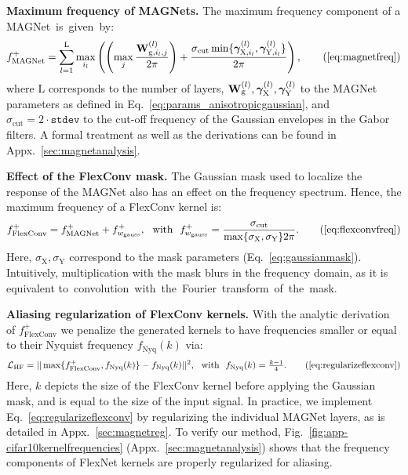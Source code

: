 \documentclass{article} \usepackage{iclr2022_conference,times}
\newcommand{\mat}[1]{\ensuremath{{\mathbf{\MakeUppercase{{#1}}}}}}
\newcommand{\Wm}{\mat{W}}
\def\Xt{\mathrm{X}}
\def\Yt{\mathrm{Y}}
\begin{document}
\textbf{Maximum frequency of MAGNets.}
The maximum frequency component of a MAGNet~is~given~by:
\begin{equation}
\setlength{\abovedisplayskip}{3pt}
\setlength{\belowdisplayskip}{2pt}
    f^+_{\textrm{MAGNet}} = \sum_{l=1}^{\mathrm{L}} \max_{i_l}\left( \left( \max_{j} \frac{\Wm^{(l)}_{\mathrm{g}, i_l,j}}{2 \pi} \right) + \frac{\sigma_\mathrm{cut} \min\{\boldsymbol{\gamma}^{(l)}_{\Xt, i_l}, \boldsymbol{\gamma}^{(l)}_{\Yt,i_l}\}}{2 \pi}\right), \tag{\ref{eq:magnetfreq}}
\end{equation}
where $\mathrm{L}$ corresponds to the number of layers, $\Wm^{(l)}_{\mathrm{g}}, \boldsymbol{\gamma}^{(l)}_{\Xt}, \boldsymbol{\gamma}^{(l)}_{\Yt}$ to the MAGNet parameters as defined in Eq.~\ref{eq:params_anisotropicgaussian}, and $\sigma_\mathrm{cut}{=}2\cdot \mathtt{stdev}$ to the cut-off frequency of the Gaussian envelopes in the Gabor filters. A formal treatment as well as the derivations can be found in Appx.~\ref{sec:magnetanalysis}.


\textbf{Effect of the FlexConv mask.} The Gaussian mask used to localize the response of the MAGNet 
also has an effect on the frequency spectrum. Hence, the maximum frequency of a FlexConv kernel is:
\begin{equation}
\setlength{\abovedisplayskip}{2pt}
\setlength{\belowdisplayskip}{3pt}
    f^+_{\textrm{FlexConv}} = f^+_{\textrm{MAGNet}} + f^+_{w_\textrm{gauss}}, \ \ \text{with}\ \  f^+_{w_\textrm{gauss}}=
    \frac{\sigma_\mathrm{cut}}{\max\{\sigma_\Xt, \sigma_\Yt\} 2 \pi}. \tag{\ref{eq:flexconvfreq}}
\end{equation}
Here, $\sigma_{\Xt}, \sigma_{\Yt}$ correspond to the mask parameters (Eq.~\ref{eq:gaussianmask}). Intuitively, multiplication with the mask blurs in the frequency domain, as it is equivalent to~convolution~with~the~Fourier~transform~of~the~mask.

\textbf{Aliasing regularization of FlexConv kernels.} With the analytic derivation of $f^+_{\textrm{FlexConv}}$ we penalize the generated kernels to have frequencies smaller or equal to their Nyquist frequency $f_{\mathrm{Nyq}}(k)$ via:
\begin{equation}
\setlength{\abovedisplayskip}{4pt}
\setlength{\belowdisplayskip}{5pt}
    \mathcal{L}_{\mathrm{HF}} = ||\max\{f^+_{\textrm{FlexConv}}, f_{\mathrm{Nyq}}(k)\} - f_{\mathrm{Nyq}}(k)||^2, \ \ \text{with} \ \ f_{\textrm{Nyq}}(k) = \tfrac{k-1}{4}. \tag{\ref{eq:regularizeflexconv}}
\end{equation}
Here, $k$ depicts the size of the FlexConv kernel before applying the Gaussian mask, and is equal to the size of the input signal. In practice, we implement Eq.~\ref{eq:regularizeflexconv} by regularizing the individual MAGNet layers, as is detailed in Appx.~\ref{sec:magnetreg}. To verify our method, Fig.~\ref{fig:app-cifar10kernelfrequencies} (Appx.~\ref{sec:magnetanalysis}) shows that the frequency components of FlexNet kernels are properly regularized for aliasing.
\vspace{-2mm}
\end{document}

